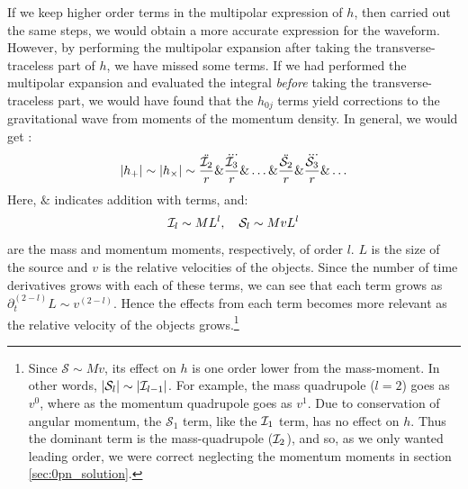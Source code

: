 If we keep higher order terms in the multipolar expression of $h$, then carried out the same steps, we would obtain a more accurate expression for the waveform. However, by performing the multipolar expansion after taking the transverse-traceless part of $h$, we have missed some terms. If we had performed the multipolar expansion and evaluated the integral \emph{before} taking the transverse-traceless part, we would have found that the $h_{0j}$ terms yield corrections to the gravitational wave from moments of the momentum density. In general, we would get \cite{BlanfordThorne}:
\begin{equation}
|h_{+}| \sim |h_{\times}| \sim \frac{\ddot{\mathcal{I}_2}}{r} \& \frac{\dddot{\mathcal{I}_3}}{r} \& \ldots \& \frac{\ddot{\mathcal{S}_2}}{r} \& \frac{\dddot{\mathcal{S}_3}}{r} \& \ldots
\end{equation}
Here, $\&$ indicates addition with terms, and:
\begin{equation}
\mathcal{I}_l \sim ML^l, \quad \mathcal{S}_l \sim MvL^l
\end{equation}
are the mass and momentum moments, respectively, of order $l$. $L$ is the size of the source and $v$ is the relative velocities of the objects. Since the number of time derivatives grows with each of these terms, we can see that each term grows as $\partial_t^{(2-l)} L \sim v^{(2-l)}$. Hence the effects from each term becomes more relevant as the relative velocity of the objects grows.\footnote{Since $\mathcal{S} \sim Mv$, its effect on $h$ is one order lower from the mass-moment. In other words, $|\mathcal{S}_l| \sim |\mathcal{I}_{l-1}|$. For example, the mass quadrupole ($l=2$) goes as $v^0$, where as the momentum quadrupole goes as $v^1$. Due to conservation of angular momentum, the $\mathcal{S}_1$ term, like the $\mathcal{I}_1$ term, has no effect on $h$. Thus the dominant term is the mass-quadrupole ($\mathcal{I}_2$), and so, as we only wanted leading order, we were correct neglecting the momentum moments in section \ref{sec:0pn_solution}.}

